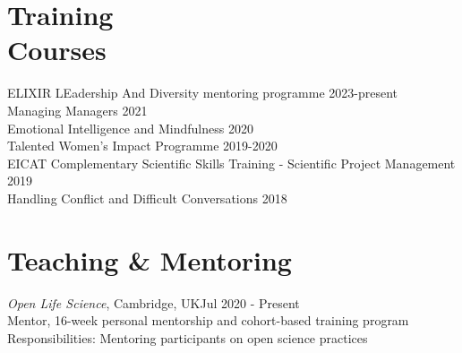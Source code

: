 \documentclass[margin,line]{res}
\begin{document}
\begin{resume}

\section{\sc Training\\ Courses}

ELIXIR LEadership And Diversity mentoring programme \hfill {2023-present}\\
Managing Managers \hfill {2021}\\
Emotional Intelligence and Mindfulness \hfill {2020}\\
Talented Women's Impact Programme \hfill {2019-2020}\\
EICAT Complementary Scientific Skills Training - Scientific Project Management \hfill {2019}\\
Handling Conflict and Difficult Conversations \hfill {2018}


\section{\sc Teaching \& Mentoring}
{\em Open Life Science}, Cambridge, UK\hfill {Jul 2020 - Present}\\
Mentor, 16-week personal mentorship and cohort-based training program\\
Responsibilities: Mentoring participants on open science practices


\end{resume}
\end{document}
